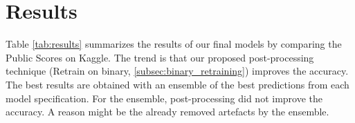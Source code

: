 
\section{Results} \label{section:results}

Table \ref{tab:results} summarizes the results of our final models by comparing the Public Scores on Kaggle.
The trend is that our proposed post-processing technique  (Retrain on binary, \ref{subsec:binary_retraining}) improves the accuracy. The best results are obtained with an ensemble of the best predictions from each model specification. For the ensemble, post-processing did not improve the accuracy. A reason might be the already removed artefacts by the ensemble.



